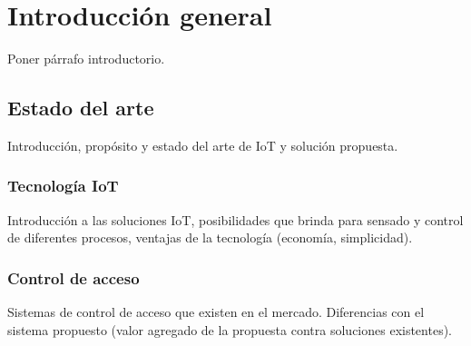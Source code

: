 
\chapter{Introducción general} %

\label{Chapter1} %
\label{IntroGeneral}

Poner párrafo introductorio.


\newcommand{\keyword}[1]{\textbf{#1}}
\newcommand{\tabhead}[1]{\textbf{#1}}
\newcommand{\code}[1]{\texttt{#1}}
\newcommand{\file}[1]{\texttt{\bfseries#1}}
\newcommand{\option}[1]{\texttt{\itshape#1}}
\newcommand{\grados}{$^{\circ}$}



\section{Estado del arte}

Introducción, propósito y estado del arte de IoT y solución propuesta.

\subsection{Tecnología IoT}

Introducción a las soluciones IoT, posibilidades que brinda para sensado y control de diferentes procesos, ventajas de la tecnología (economía, simplicidad).

\subsection{Control de acceso}

Sistemas de control de acceso que existen en el mercado. Diferencias con el sistema propuesto (valor agregado de la propuesta contra soluciones existentes).

